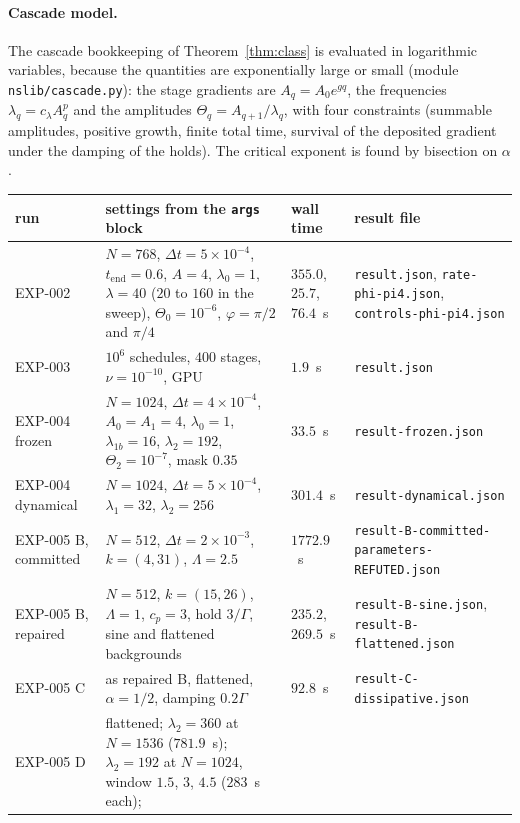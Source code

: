 \documentclass[11pt]{article}
\theoremstyle{remark}
\newcommand{\fp}[1]{\nolinkurl{#1}}
\begin{document}
\paragraph{Cascade model.} The cascade bookkeeping of Theorem~\ref{thm:class} is evaluated in
logarithmic variables, because the quantities are exponentially large or small
(module \fp{nslib/cascade.py}): the stage gradients are $A_{q}=A_{0}e^{gq}$, the frequencies
$\lambda_{q}=c_{\lambda}A_{q}^{p}$ and the amplitudes $\Theta_{q}=A_{q+1}/\lambda_{q}$, with four
constraints (summable amplitudes, positive growth, finite total time, survival of the deposited gradient
under the damping of the holds). The critical exponent is found by bisection on $\alpha$.

\begin{table}[t]
\centering\footnotesize
\setlength{\tabcolsep}{3pt}
\begin{tabular}{@{}L{1.55cm}L{6.1cm}L{2.7cm}L{4.4cm}@{}}
\toprule
run & settings from the \fp{args} block & wall time & result file \\
\midrule
EXP-002 & $N=768$, $\Delta t=5\times10^{-4}$, $t_{\mathrm{end}}=0.6$, $A=4$, $\lambda_{0}=1$,
$\lambda=40$ ($20$ to $160$ in the sweep), $\Theta_{0}=10^{-6}$, $\varphi=\pi/2$ and $\pi/4$ &
$355.0$, $25.7$, $76.4$~s & \fp{result.json}, \fp{rate-phi-pi4.json}, \fp{controls-phi-pi4.json} \\
EXP-003 & $10^{6}$ schedules, $400$ stages, $\nu=10^{-10}$, GPU & $1.9$~s & \fp{result.json} \\
EXP-004 frozen & $N=1024$, $\Delta t=4\times10^{-4}$, $A_{0}=A_{1}=4$, $\lambda_{0}=1$, $\lambda_{1b}=16$,
$\lambda_{2}=192$, $\Theta_{2}=10^{-7}$, mask $0.35$ & $33.5$~s & \fp{result-frozen.json} \\
EXP-004 dynamical & $N=1024$, $\Delta t=5\times10^{-4}$, $\lambda_{1}=32$, $\lambda_{2}=256$ & $301.4$~s & \fp{result-dynamical.json} \\
EXP-005 B, committed & $N=512$, $\Delta t=2\times10^{-3}$, $k=(4,31)$, $\Lambda=2.5$ & $1772.9$~s &
\texttt{result-B-committed-}\allowbreak\texttt{parameters-REFUTED.json} \\
EXP-005 B, repaired & $N=512$, $k=(15,26)$, $\Lambda=1$, $c_{p}=3$, hold $3/\Gamma$, sine and flattened backgrounds &
$235.2$, $269.5$~s & \fp{result-B-sine.json}, \fp{result-B-flattened.json} \\
EXP-005 C & as repaired B, flattened, $\alpha=1/2$, damping $0.2\Gamma$ & $92.8$~s & \fp{result-C-dissipative.json} \\
EXP-005 D & flattened; $\lambda_{2}=360$ at $N=1536$ ($781.9$~s); $\lambda_{2}=192$ at $N=1024$, window $1.5$, $3$, $4.5$ ($283$~s each);

\end{tabular}
\end{table}
\end{document}
